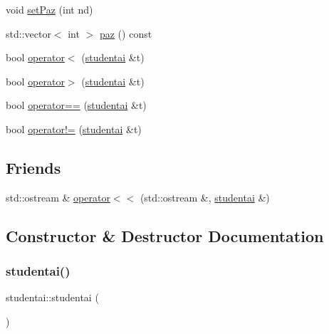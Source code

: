 \begin{DoxyCompactItemize}
void \mbox{\hyperlink{classstudentai_a4bfff963949a3a5aa2856827d1716543}{set\+Paz}} (int nd)
\item 
std\+::vector$<$ int $>$ \mbox{\hyperlink{classstudentai_a0a5183a3d9679d0a71e0e6f8a1c70560}{paz}} () const
\item 
bool \mbox{\hyperlink{classstudentai_adfd1e116c63411da1819da800355dd4d}{operator$<$}} (\mbox{\hyperlink{classstudentai}{studentai}} \&t)
\item 
bool \mbox{\hyperlink{classstudentai_a2addcff31136907fcff986ac4b0b321c}{operator$>$}} (\mbox{\hyperlink{classstudentai}{studentai}} \&t)
\item 
bool \mbox{\hyperlink{classstudentai_a31c7f035921dbc25bea25f46b1813151}{operator==}} (\mbox{\hyperlink{classstudentai}{studentai}} \&t)
\item 
bool \mbox{\hyperlink{classstudentai_a7a3b7897b606939df81d11830d366991}{operator!=}} (\mbox{\hyperlink{classstudentai}{studentai}} \&t)
\end{DoxyCompactItemize}
\subsection*{Friends}
\begin{DoxyCompactItemize}
\item 
std\+::ostream \& \mbox{\hyperlink{classstudentai_ae5b471d7fdfc5bfd7d76bb9aff82093a}{operator$<$$<$}} (std\+::ostream \&, \mbox{\hyperlink{classstudentai}{studentai}} \&)
\end{DoxyCompactItemize}


\subsection{Constructor \& Destructor Documentation}
\mbox{\label{classstudentai_a60b1c161d9a3ba14298ecc0b126a4368}} 
\subsubsection{\texorpdfstring{studentai()}{studentai()}}
{\footnotesize\ttfamily studentai\+::studentai (\begin{DoxyParamCaption}{ }\end{DoxyParamCaption})\hspace{0.3cm}{\ttfamily [inline]}}



